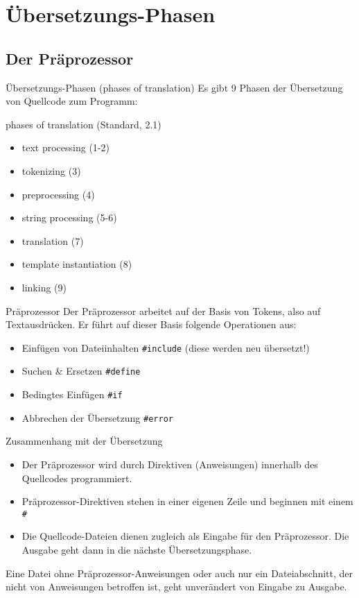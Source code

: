 \section{Übersetzungs-Phasen}


\subsection{Der Präprozessor}

\begin{frame}{Übersetzungs-Phasen (phases of translation)}
	Es gibt 9 Phasen der Übersetzung von Quellcode zum Programm:
	
	\begin{block}{phases of translation (Standard, 2.1)}
		\begin{itemize}
			\item text processing (1-2)
			\item tokenizing (3)
			\item preprocessing (4)
			\item string processing (5-6)
			\item translation (7)
			\item template instantiation (8)
			\item linking (9)
		\end{itemize}
	\end{block}
\end{frame}

\begin{frame}[fragile]{Präprozessor}
	Der Präprozessor arbeitet auf der Basis von Tokens, also auf Textausdrücken. Er führt auf dieser Basis folgende Operationen aus:
	
	\begin{itemize}
		\item Einfügen von Dateiinhalten \verb|#include| (diese werden neu übersetzt!)
		\item Suchen \& Ersetzen \verb|#define|
		\item Bedingtes Einfügen \verb|#if|
		\item Abbrechen der Übersetzung \verb|#error|
	\end{itemize}
\end{frame}

\begin{frame}[fragile]{Zusammenhang mit der Übersetzung}
	\begin{itemize}
		\item Der Präprozessor wird durch Direktiven (Anweisungen) innerhalb des Quellcodes programmiert.
		\item Präprozessor-Direktiven stehen in einer eigenen Zeile und beginnen mit einem \verb|#|
		\item Die Quellcode-Dateien dienen zugleich als Eingabe für den Präprozessor. Die Ausgabe geht dann in die nächste Übersetzungsphase.
	\end{itemize}
	
	\pause
	
	Eine Datei ohne Präprozessor-Anweisungen oder auch nur ein Dateiabschnitt, der nicht von Anweisungen betroffen ist, geht unverändert von Eingabe zu Ausgabe.
\end{frame}


